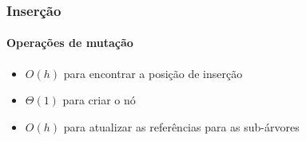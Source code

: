 \documentclass{beamer}
\begin{document}
\begin{frame}

\frametitle{Inserção}
\framesubtitle{Operações de mutação}

\begin{itemize}

  \item $O(h)$ para encontrar a posição de inserção

  \item $\Theta(1)$ para criar o nó

  \item $O(h)$ para atualizar as referências para as sub-árvores

\end{itemize}


\end{frame}

\end{document}
